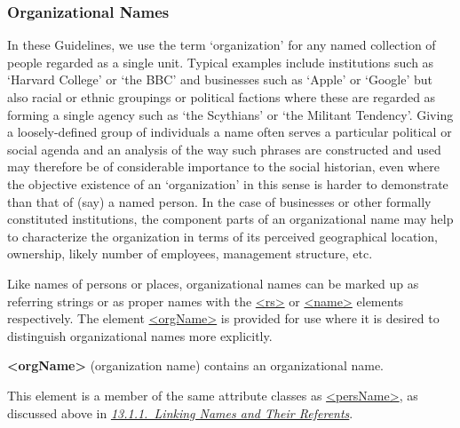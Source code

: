 \subsubsection[{Organizational Names}]{Organizational Names}\label{NDORG}\par
In these Guidelines, we use the term ‘organization’ for any named collection of people regarded as a single unit. Typical examples include institutions such as ‘Harvard College’ or ‘the BBC’ and businesses such as ‘Apple’ or ‘Google’ but also racial or ethnic groupings or political factions where these are regarded as forming a single agency such as ‘the Scythians’ or ‘the Militant Tendency’. Giving a loosely-defined group of individuals a name often serves a particular political or social agenda and an analysis of the way such phrases are constructed and used may therefore be of considerable importance to the social historian, even where the objective existence of an ‘organization’ in this sense is harder to demonstrate than that of (say) a named person. In the case of businesses or other formally constituted institutions, the component parts of an organizational name may help to characterize the organization in terms of its perceived geographical location, ownership, likely number of employees, management structure, etc.\par
Like names of persons or places, organizational names can be marked up as referring strings or as proper names with the \hyperref[TEI.rs]{<rs>} or \hyperref[TEI.name]{<name>} elements respectively. The element \hyperref[TEI.orgName]{<orgName>} is provided for use where it is desired to distinguish organizational names more explicitly. 
\begin{sansreflist}
  
\item [\textbf{<orgName>}] (organization name) contains an organizational name.
\end{sansreflist}
 This element is a member of the same attribute classes as \hyperref[TEI.persName]{<persName>}, as discussed above in \textit{\hyperref[NDATTSnr]{13.1.1.\ Linking Names and Their Referents}}.\par
